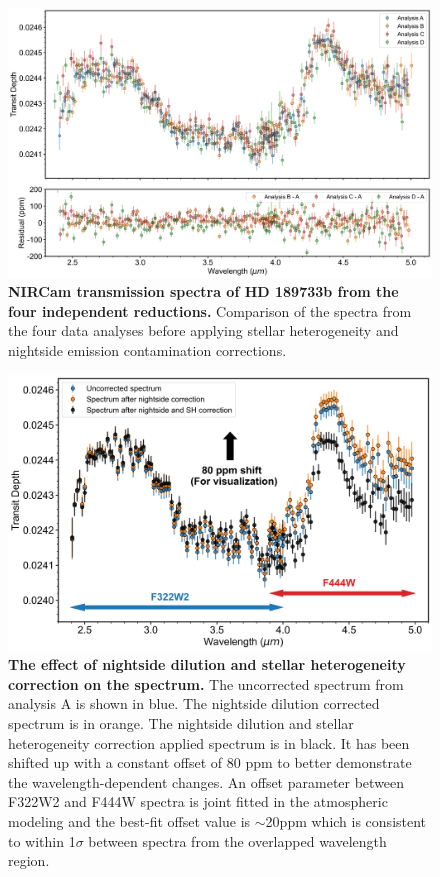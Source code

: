 \documentclass[sn-standardnature]{sn-jnl}%
\begin{document}
\begin{figure}
\centering
  \includegraphics[width=\textwidth,keepaspectratio]{figs/ED_Fig5.png}
  \caption{\textbf{NIRCam transmission spectra of HD 189733b from the four independent reductions.} Comparison of the spectra from the four data analyses before applying stellar heterogeneity and nightside emission contamination corrections.}
  \label{fig:compare_reductions}
\end{figure}

\begin{figure}
\centering
  \includegraphics[width=\textwidth,keepaspectratio]{figs/ED_Fig6.png}
  \caption{\textbf{The effect of nightside dilution and stellar heterogeneity correction on the spectrum.} The uncorrected spectrum from analysis A is shown in blue. The nightside dilution corrected spectrum is in orange. The nightside dilution and stellar heterogeneity correction applied spectrum is in black. It has been shifted up with a constant offset of 80 ppm to better demonstrate the wavelength-dependent changes. An offset parameter between F322W2 and F444W spectra is joint fitted in the atmospheric modeling and the best-fit offset value is $\sim$20ppm which is consistent to within 1$\sigma$ between spectra from the overlapped wavelength region.}
  \label{fig:correction_plot}
\end{figure}
\end{document}
